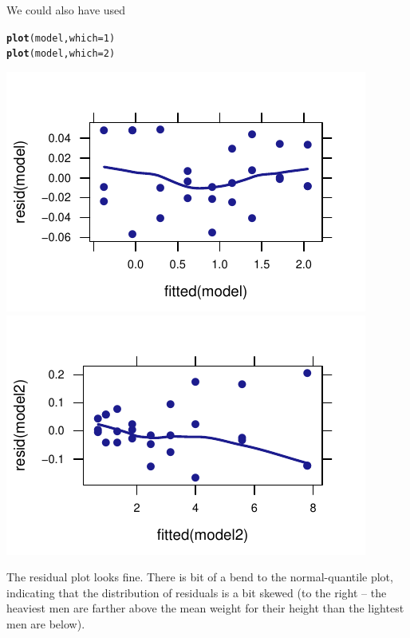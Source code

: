 \documentclass[twoside]{book}\usepackage[]{graphicx}\usepackage[]{xcolor}
\makeatletter
\def\maxwidth{ %
  \ifdim\Gin@nat@width>\linewidth
    \linewidth
  \else
    \Gin@nat@width
  \fi
}
\newcommand{\hlnum}[1]{\textcolor[rgb]{0.686,0.059,0.569}{#1}}%
\newcommand{\hlstd}[1]{\textcolor[rgb]{0.345,0.345,0.345}{#1}}%
\newcommand{\hlkwc}[1]{\textcolor[rgb]{0.333,0.667,0.333}{#1}}%
\newcommand{\hlkwd}[1]{\textcolor[rgb]{0.737,0.353,0.396}{\textbf{#1}}}%
\newenvironment{kframe}{%
 \def\at@end@of@kframe{}%
 \ifinner\ifhmode%
  \def\at@end@of@kframe{\end{minipage}}%
  \begin{minipage}{\columnwidth}%
 \fi\fi%
 \def\FrameCommand##1{\hskip\@totalleftmargin \hskip-\fboxsep
 \colorbox{shadecolor}{##1}\hskip-\fboxsep
     \hskip-\linewidth \hskip-\@totalleftmargin \hskip\columnwidth}%
 \MakeFramed {\advance\hsize-\width
   \@totalleftmargin\z@ \linewidth\hsize
   \@setminipage}}%
 {\par\unskip\endMakeFramed%
 \at@end@of@kframe}
\newenvironment{knitrout}{}{} %
\makeatother
\begin{document}
\begin{solution}
\begin{enumerate}
\begin{knitrout}
{}



\end{knitrout}
We could also have used
\begin{knitrout}
\color{fgcolor}\begin{kframe}
\begin{alltt}
\hlkwd{plot}\hlstd{(model,} \hlkwc{which} \hlstd{=} \hlnum{1}\hlstd{)}
\hlkwd{plot}\hlstd{(model,} \hlkwc{which} \hlstd{=} \hlnum{2}\hlstd{)}
\end{alltt}
\end{kframe}

{\centering \includegraphics[width=\maxwidth]{figures/fig-unnamed-chunk-212-1} 
\includegraphics[width=\maxwidth]{figures/fig-unnamed-chunk-212-2} 

}



\end{knitrout}
The residual plot looks fine.  There is bit of a bend to the normal-quantile plot, indicating
that the distribution of residuals is a bit skewed (to the right -- the heaviest men are farther above
the mean weight for their height than the lightest men are below).


\end{enumerate}
\end{solution}
\end{document}
